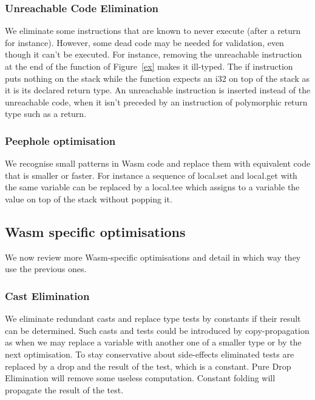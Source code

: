 \documentclass[a4paper,11pt]{article}
\begin{document}
\subsubsection{Unreachable Code Elimination}
We eliminate some instructions that are known to never execute (after a
\textsf{return} for instance). However, some dead code may be needed for
validation, even though it can't be executed. For instance, removing the
\textsf{unreachable} instruction at the end of the function of Figure~\ref{ex}
makes it ill-typed. The \textsf{if} instruction puts nothing on the stack while
the function expects an \textsf{i32} on top of the stack as it is its declared
return type. An \textsf{unreachable} instruction is inserted instead of the
unreachable code, when it isn't preceded by an instruction of polymorphic return
type such as a \textsf{return}.

\subsubsection{Peephole optimisation}
We recognise small patterns in Wasm code and replace them with equivalent code
that is smaller or faster. For instance a sequence of \textsf{local.set} and
\textsf{local.get} with the same variable can be replaced by a
\textsf{local.tee} which assigns to a variable the value on top of the stack
without popping it.


\subsection{Wasm specific optimisations}
We now review more Wasm-specific optimisations and detail in which way they use
the previous ones.
\subsubsection{Cast Elimination}
We eliminate redundant casts and replace type tests by constants if their result
can be determined. Such casts and tests could be introduced by copy-propagation
as when we may replace a variable with another one of a smaller type or by the
next optimisation. To stay conservative about side-effects eliminated tests are
replaced by a \textsf{drop} and the result of the test, which is a constant.
Pure Drop Elimination will remove some useless computation. Constant folding
will propagate the result of the test.
\end{document}
